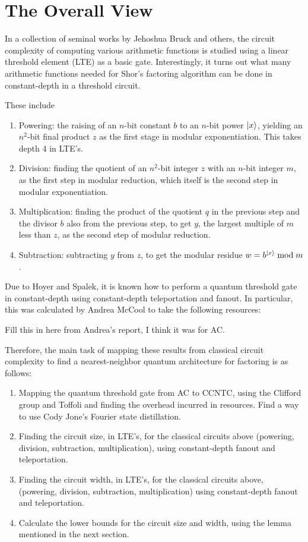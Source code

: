 \documentclass{article}
\begin{document}
\section{The Overall View}

In a collection of seminal works by Jehoshua Bruck and others,
the circuit complexity of computing various arithmetic functions
is studied using a linear threshold element (LTE) as a basic gate.
Interestingly, it turns out what many arithmetic functions needed
for Shor's factoring algorithm can be done in constant-depth in
a threshold circuit.

These include

\begin{enumerate}
\item Powering: the raising of an $n$-bit constant $b$ to an
$n$-bit power $\left\vert{x}\right\rangle$, yielding an $n^2$-bit final product $z$
as the first stage in modular exponentiation. This takes depth
4 in LTE's.

\item Division: finding the quotient of an $n^2$-bit integer $z$ with
an $n$-bit integer $m$, as the first step in modular reduction, which itself
is the second step in modular exponentiation.

\item Multiplication: finding the product of the quotient $q$ in the 
previous step and the divisor $b$ also from the previous step, to get
$y$, the largest multiple of $m$ less than $z$, as the second step
of modular reduction.

\item Subtraction: subtracting $y$ from $z$, to get the modular residue
$w = b^{\left\vert{x}\right\rangle} \bmod m$.
\end{enumerate}

Due to Hoyer and Spalek, it is known how to perform a quantum
threshold gate in constant-depth using constant-depth teleportation
and fanout. In particular, this was calculated by Andrea McCool to take
the following resources:

Fill this in here from Andrea's report, I think it was for AC.

Therefore, the main task of mapping these results from classical circuit
complexity to find a nearest-neighbor quantum architecture for factoring
is as follows:

\begin{enumerate}
\item Mapping the quantum threshold gate from AC to CCNTC, using the 
Clifford group and Toffoli and finding 
the overhead incurred in resources. Find a way to use Cody Jone's Fourier
state distillation.
\item Finding the circuit size, in LTE's, for the classical circuits above
(powering, division, subtraction, multiplication),
using constant-depth fanout and teleportation.
\item Finding the circuit width, in LTE's, for the classical circuits above,
(powering, division, subtraction, multiplication)
using constant-depth fanout and teleportation.
\item Calculate the lower bounds for the circuit size and width, using
the lemma mentioned in the next section.
\end{enumerate}
\end{document}
